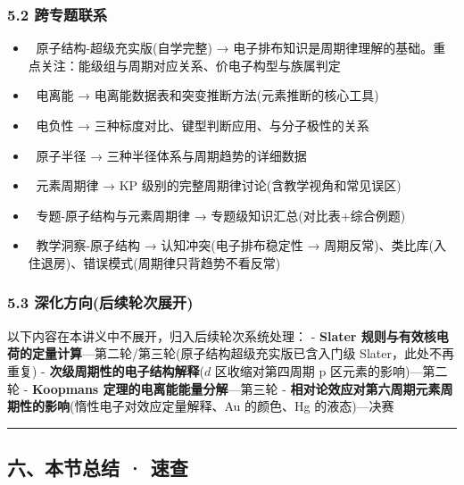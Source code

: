 \subsubsection{5.2 跨专题联系}\label{ux8de8ux4e13ux9898ux8054ux7cfb}

\begin{itemize}
\tightlist
\item
  🔗 原子结构-超级充实版(自学完整) → 电子排布知识是周期律理解的基础。重点关注：能级组与周期对应关系、价电子构型与族属判定
\item
  🔗 电离能 → 电离能数据表和突变推断方法(元素推断的核心工具)
\item
  🔗 电负性 → 三种标度对比、键型判断应用、与分子极性的关系
\item
  🔗 原子半径 → 三种半径体系与周期趋势的详细数据
\item
  🔗 元素周期律 → KP 级别的完整周期律讨论(含教学视角和常见误区)
\item
  🔗 专题-原子结构与元素周期律 → 专题级知识汇总(对比表+综合例题)
\item
  🔗 教学洞察-原子结构 → 认知冲突(电子排布稳定性 → 周期反常)、类比库(入住退房)、错误模式(周期律只背趋势不看反常)
\end{itemize}

\subsubsection{5.3 深化方向(后续轮次展开)}\label{ux6df1ux5316ux65b9ux5411ux540eux7eedux8f6eux6b21ux5c55ux5f00}

以下内容在本讲义中不展开，归入后续轮次系统处理：
- \textbf{Slater 规则与有效核电荷的定量计算}---第二轮/第三轮(原子结构超级充实版已含入门级 Slater，此处不再重复)
- \textbf{次级周期性的电子结构解释}(\(d\) 区收缩对第四周期 p 区元素的影响)---第二轮
- \textbf{Koopmans 定理的电离能能量分解}---第三轮
- \textbf{相对论效应对第六周期元素周期性的影响}(惰性电子对效应定量解释、Au 的颜色、Hg 的液态)---决赛

\begin{center}\rule{0.5\linewidth}{0.5pt}\end{center}

\subsection{六、本节总结 · 速查}\label{ux516dux672cux8282ux603bux7ed3-ux901fux67e5}


